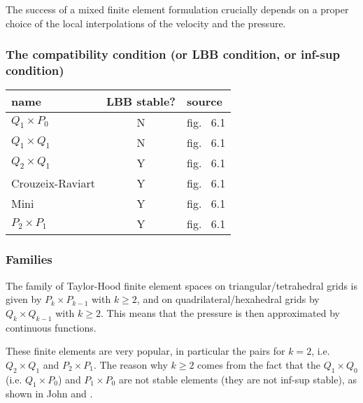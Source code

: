 

The success of a mixed finite element formulation crucially depends on a proper choice of the local interpolations of the velocity and the pressure. 

\subsubsection{The compatibility condition (or LBB condition, or inf-sup condition)} \label{ss:LBBcond}
 



\begin{tabular}{lcl}
\hline
name & LBB stable? & source \\
\hline
\hline
$Q_1 \times P_0$ & N & fig.~ 6.1 \cite{dohu} \\
$Q_1 \times Q_1$ & N & fig.~ 6.1 \cite{dohu} \\
$Q_2 \times Q_1$ & Y & fig.~ 6.1 \cite{dohu} \\
Crouzeix-Raviart & Y & fig.~ 6.1 \cite{dohu} \\
Mini             & Y & fig.~ 6.1 \cite{dohu} \\
\hline
$P_2 \times P_1$ & Y & fig.~ 6.1 \cite{dohu} \\
\hline
\end{tabular}



\subsubsection{Families}

The family of {\color{olive} Taylor-Hood} finite element spaces on triangular/tetrahedral 
grids is given by $P_k \times P_{k-1}$ with $k\geq 2$, 
and on quadrilateral/hexahedral grids by $Q_k \times Q_{k-1}$ with $k\geq 2$.
This means that the pressure is then approximated by continuous functions. 

These finite elements are very popular, in particular the pairs for $k=2$, i.e.
$Q_2\times Q_1$ and $P_2\times P_1$.
The reason why $k\geq 2$ comes from the fact that the 
$Q_1 \times Q_0$ (i.e. $Q_1 \times P_0$) and $P_1\times P_0$
are not stable elements (they are not inf-sup stable), as
shown in John \cite[p64]{john16} and \cite[p67]{john16}. 

